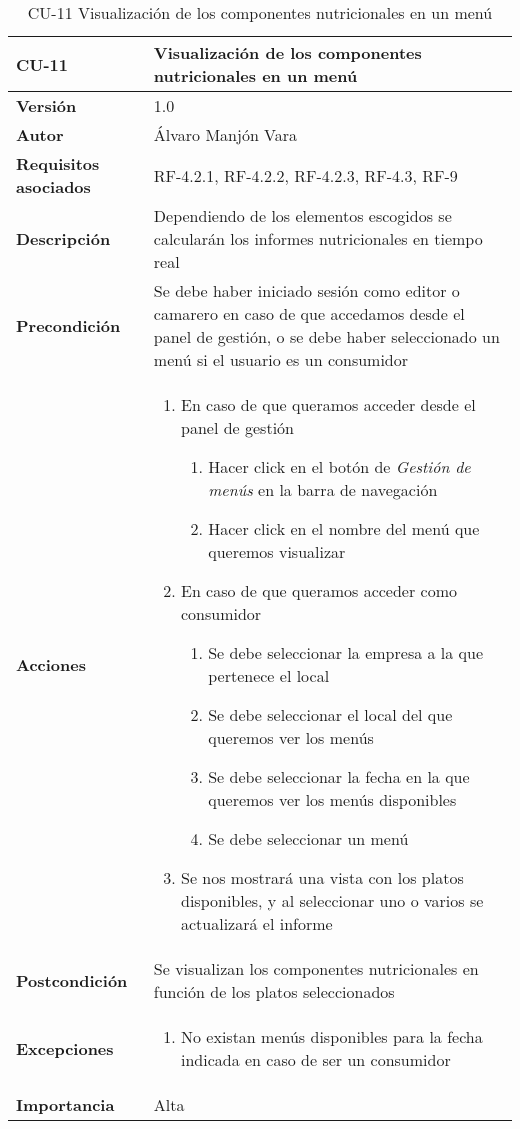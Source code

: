 \begin{table}[htp]
	\centering
	\begin{tabularx}{\linewidth}{ p{} p{} }
		\toprule
		\textbf{CU-11}    & \textbf{Visualización de los componentes nutricionales en un menú}\\
		\toprule
		\textbf{Versión}              & 1.0    \\
		\textbf{Autor}                & Álvaro Manjón Vara \\
		\textbf{Requisitos asociados} & RF-4.2.1, RF-4.2.2, RF-4.2.3, RF-4.3, RF-9 \\
		\textbf{Descripción}          & Dependiendo de los elementos escogidos se calcularán los informes nutricionales en tiempo real \\
		\textbf{Precondición}         & Se debe haber iniciado sesión como editor o camarero en caso de que accedamos desde el panel de gestión, o se debe haber seleccionado un menú si el usuario es un consumidor \\
		\textbf{Acciones}             &
		\begin{enumerate}
			\def\labelenumi{\arabic{enumi}.}
			\tightlist
			\item En caso de que queramos acceder desde el panel de gestión
			\begin{enumerate}
  				\item Hacer click en el botón de \textit{Gestión de menús} en la barra de navegación
  				\item Hacer click en el nombre del menú que queremos visualizar
			\end{enumerate}
			\item En caso de que queramos acceder como consumidor
			\begin{enumerate}
  				\item Se debe seleccionar la empresa a la que pertenece el local
  				\item Se debe seleccionar el local del que queremos ver los menús
  				\item Se debe seleccionar la fecha en la que queremos ver los menús disponibles
  				\item Se debe seleccionar un menú
			\end{enumerate}
			\item Se nos mostrará una vista con los platos disponibles, y al seleccionar uno o varios se actualizará el informe
		\end{enumerate}\\
		\textbf{Postcondición}        & Se visualizan los componentes nutricionales en función de los platos seleccionados \\
		\textbf{Excepciones}          & \begin{enumerate}
  \item No existan menús disponibles para la fecha indicada en caso de ser un consumidor
\end{enumerate}

 \\
		\textbf{Importancia}          & Alta \\
		\bottomrule
	\end{tabularx}
	\caption{CU-11 Visualización de los componentes nutricionales en un menú}
\end{table}
\afterpage{\clearpage}